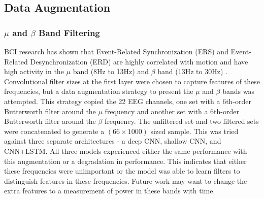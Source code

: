 \documentclass[10pt,twocolumn,letterpaper]{article}
\begin{document}
\subsection{Data Augmentation}

\subsubsection{$\mu$ and $\beta$ Band Filtering}


BCI research has shown that Event-Related Synchronization (ERS) and
Event-Related Desynchronization (ERD) are highly correlated with motion and have
high activity in the $\mu$ band (8Hz to 13Hz) and $\beta$ band (13Hz to 30Hz)
\cite{yang2013subject}.
Convolutional filter sizes at the first layer were chosen to capture features of
these frequencies, but a data augmentation strategy to present the $\mu$ and
$\beta$ bands was attempted. This strategy copied the 22 EEG channels, one set
with a 6th-order Butterworth filter around the $\mu$ frequency and another set
with a 6th-order Butterworth filter around the $\beta$ frequency. The unfiltered
set and two filtered sets were concatenated to generate a $(66 \times 1000)$
sized sample. This was tried against three separate architectures - a deep CNN,
shallow CNN, and CNN+LSTM. All three models experienced either the same
performance with this augmentation or a degradation in performance. This
indicates that either these frequencies were unimportant or the model was
able to learn filters to distinguish features in these frequencies. Future work
may want to change the extra features to a measurement of power in these bands
with time.

\end{document}
